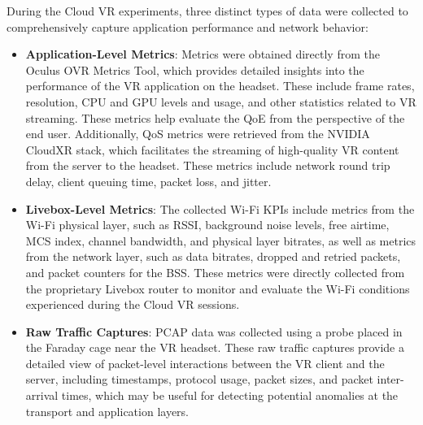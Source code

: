 During the Cloud VR experiments, three distinct types of data were collected to comprehensively capture application performance and network behavior:
\begin{itemize}
    \item \textbf{Application-Level Metrics}: Metrics were obtained directly from the Oculus OVR Metrics Tool, which provides detailed insights into the performance of the VR application on the headset. These include frame rates, resolution, CPU and GPU levels and usage, and other statistics related to VR streaming. These metrics help evaluate the QoE from the perspective of the end user. Additionally, QoS metrics were retrieved from the NVIDIA CloudXR stack, which facilitates the streaming of high-quality VR content from the server to the headset. These metrics include network round trip delay, client queuing time, packet loss, and jitter.
   \item \textbf{Livebox-Level Metrics}: The collected Wi-Fi KPIs include metrics from the Wi-Fi physical layer, such as \ac{RSSI}, background noise levels, free airtime, \ac{MCS} index, channel bandwidth, and physical layer bitrates, as well as metrics from the network layer, such as data bitrates, dropped and retried packets, and packet counters for the \ac{BSS}. These metrics were directly collected from the proprietary Livebox router to monitor and evaluate the Wi-Fi conditions experienced during the Cloud VR sessions.
   \item \textbf{Raw Traffic Captures}: \ac{PCAP} data was collected using a probe placed in the Faraday cage near the VR headset. These raw traffic captures provide a detailed view of packet-level interactions between the VR client and the server, including timestamps, protocol usage, packet sizes, and packet inter-arrival times, which may be useful for detecting potential anomalies at the transport and application layers.
\end{itemize}





